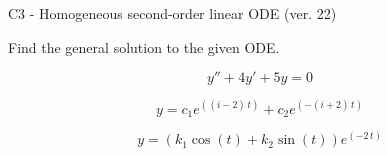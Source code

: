 \begin{exercise}
  \begin{exerciseTitle}C3 - Homogeneous second-order linear ODE (ver. 22)\end{exerciseTitle}
  \begin{exerciseStatement}
    
Find the general solution to the given ODE.

    
\[y''+4y'+5y = 0\]

  \end{exerciseStatement}
  \begin{exerciseAnswer}
    
\[y= c_{1} e^{\left(\left(i - 2\right) \, t\right)} + c_{2} e^{\left(-\left(i + 2\right) \, t\right)}\]

    
\[y= {\left(k_{1} \cos\left(t\right) + k_{2} \sin\left(t\right)\right)} e^{\left(-2 \, t\right)}\]

  \end{exerciseAnswer}
\end{exercise}